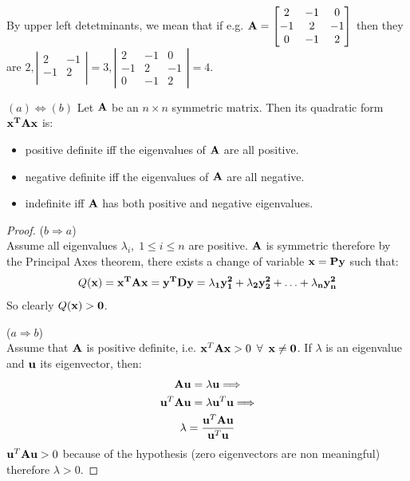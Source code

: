 \documentclass[a4paper]{article}
\numberwithin{equation}{section} %
\newcommand{\B}[1]{\textbf{\textup{#1}}} %
\begin{document}
By upper left detetminants, we mean that if e.g. $\B{A}=\begin{bmatrix}2 & -1 & 0\\-1 & 2 & -1\\0 & -1 & 2 \end{bmatrix}$ then they are $2, \left| \begin{matrix}
   2 & -1  \\
   -1 & 2  \\
\end{matrix} \right|=3
, \left| \begin{matrix}2 & -1 & 0\\-1 & 2 & -1\\0 & -1 & 2 \end{matrix}\right|=4$.
  \begin{lemma}
  $(a) \Leftrightarrow (b)$ Let $\bf{A}$ be an $n \times n$ symmetric matrix. Then its quadratic form $\bf{x}^T\bf{Ax}$ is:
  \begin{itemize}
    \item positive definite iff the eigenvalues of $\bf{A}$ are all positive.
    \item negative definite iff the eigenvalues of $\bf{A}$ are all negative.
    \item indefinite iff $\bf{A}$ has both positive and negative eigenvalues.
  \end{itemize}
  \end{lemma}
  
\begin{proof} ($b \Rightarrow a$)\\
Assume all eigenvalues $\lambda_i, \; 1\leq i \leq n$ are positive. $\bf{A}$ is symmetric therefore by the Principal Axes theorem, there exists a change of variable $\bf{x}=\bf{Py}$ such that:
\[
Q(\bf{x})=\bf{x}^T\bf{Ax}=\bf{y}^T\bf{Dy}=\lambda_{1}y_{1}^2+\lambda_{2}y_{2}^2+\ldots+\lambda_{n}y_{n}^2
\]
So clearly $Q(\bf{x})>0$.

($a \Rightarrow b$)\\
Assume that $\B{A}$ is positive definite, i.e. $\B{x}^{T}\B{Ax}>0 \enspace \forall \enspace \B{x} \neq \B{0}$. If $\lambda$ is an eigenvalue and $\B{u}$ its eigenvector, then:
\[
\begin{gathered}
	\B{A}\B{u}=\lambda \B{u} \Longrightarrow \\
    \B{u}^{T}\B{A}\B{u} = \lambda \B{u}^{T}\B{u} \Longrightarrow \\
    \lambda = \frac{\B{u}^{T}\B{A}\B{u}}{\B{u}^{T}\B{u}}
\end{gathered}
\]
$\B{u}^{T}\B{A}\B{u}>0$ because of the hypothesis (zero eigenvectors are non meaningful) therefore $\lambda>0$.
\end{proof}
\end{document}
